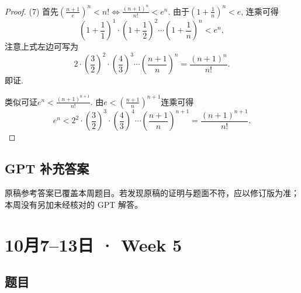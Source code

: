 \documentclass[UTF8,11pt, a4paper, oneside, fontset=none]{ctexbook}
\begin{document}
\begin{enumerate}
\begin{proof}
(7) 首先$\left( \frac{n+1}{e} \right)^n < n!  \Leftrightarrow \frac{(n+1)^n}{n!} < e^n$. 由于$\left(1+ \frac{1}{n} \right)^n <e$, 连乘可得
\[
\left(1+ \frac{1}{1} \right)^1 \cdot \left(1+ \frac{1}{2} \right)^2 \cdots \left(1+ \frac{1}{n} \right)^n < e^n,
\]
注意上式左边可写为
\[
2 \cdot (\frac{3}{2})^2 \cdot (\frac{4}{3})^3 \cdots (\frac{n+1}{n})^n =  \frac{(n+1)^n}{n!}.
\]
即证.


类似可证$e^n < \frac{(n+1)^{n+1}}{n!}$. 由$e < (\frac{n+1}{n})^{n+1}$连乘可得
\[
e^n < 2^2 \cdot (\frac{3}{2})^3 \cdot (\frac{4}{3})^4 \cdots (\frac{n+1}{n})^{n+1} = \frac{(n+1)^{n+1}}{n!}.
\]



\end{proof}
\end{enumerate}

\clearpage

\subsection*{GPT 补充答案}

\noindent 原稿参考答案已覆盖本周题目。若发现原稿的证明与题面不符，应以修订版为准；本周没有另加未经核对的 GPT 解答。

\clearpage

\section{10月7--13日 · Week 5}

\subsection*{题目}
\end{document}
